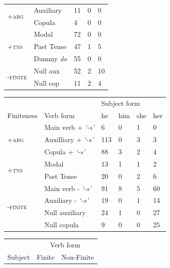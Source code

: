 \begin{table}[!h]
\begin{minipage}[t]{0.5\textwidth}
\begin{tabular}{lllll}
\multirow{2}{*}{\textsc{+arg}} & Auxiliary & 11 & 0 & 0 \\
 & Copula & 4 & 0 & 0 \\ \hline
\multirow{3}{*}{\textsc{+tns}} & Modal & 72 & 0 & 0 \\
 & Past Tense & 47 & 1 & 5 \\
 & Dummy \textit{do} & 55 & 0 & 0 \\ \hline
\multirow{2}{*}{\textsc{-finite}} & Null aux & 52 & 2 & 10 \\
 & Null cop & 11 & 2 & 4\\
\bottomrule
\end{tabular}
\end{minipage}
\vspace{1ex}
\begin{minipage}[t]{0.5\textwidth}
    \centering
    \small
\begin{tabular}{llllll}
\toprule
 &  & \multicolumn{4}{l}{Subject form} \\ \cline{3-6} 
Finiteness & Verb form & he & him & she & her \\ \hline
\multirow{3}{*}{\textsc{+arg}} & Main verb + \textit{`-s'} & 6 & 0 & 1 & 0 \\
 & Auxilliary + \textit{`-s'} & 113 & 0 & 3 & 3 \\
 & Copula + \textit{`-s'} & 88 & 3 & 2 & 4 \\ \hline
\multirow{2}{*}{\textsc{+tns}} & Modal & 13 & 1 & 1 & 2 \\
 & Past Tense & 20 & 0 & 2 & 6 \\ \hline
\multirow{4}{*}{\textsc{-finite}} & Main verb - \textit{`-s'} & 91 & 8 & 5 & 60 \\
 & Auxiliary - \textit{`-s'} & 19 & 0 & 1 & 14 \\
 & Null auxiliary & 24 & 1 & 0 & 27 \\
 & Null copula & 9 & 0 & 0 & 25\\
 \bottomrule
\end{tabular}
\end{minipage}
\vspace{1ex}
   \begin{minipage}[t]{0.5\textwidth}
    \centering
    \small
    \begin{tabular}{@{}lll@{}}
        \toprule
         & \multicolumn{2}{c}{Verb form}\\
         \cline{2-3}
        Subject & Finite & Non-Finite \\

\end{tabular}
\end{minipage}
\end{table}
